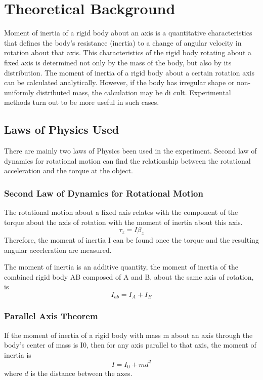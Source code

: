 \section{Theoretical Background}

Moment of inertia of a rigid body about an axis is a quantitative
characteristics that defines the body’s resistance (inertia) to a change of
angular velocity in rotation about that axis. 
This characteristics of the rigid body rotating about a fixed axis is determined
not only by the mass of the body, but also by its distribution. 
The moment of inertia of a rigid body about a certain rotation axis can be
calculated analytically. 
However, if the body has irregular shape or non-uniformly distributed mass, the
calculation may be di cult.
Experimental methods turn out to be more useful in such cases.

\subsection{Laws of Physics Used}

There are mainly two laws of Physics been used in the experiment. Second law of
dynamics for rotational motion can find the relationship between the rotational
acceleration and the torque at the object.

\subsubsection{Second Law of Dynamics for Rotational Motion}

The rotational motion about a fixed axis relates with the component of the
torque about the axis of rotation with the moment of inertia about this axis.
$$ \tau_z = I\beta_z$$
Therefore, the moment of inertia I can be found once the torque and the
resulting angular acceleration are measured.

The moment of inertia is an additive quantity, the moment of inertia of the
combined rigid body AB composed of A and B, about the same axis of rotation, is 
$$ I_{ab} = I_A + I_B $$


\subsubsection{Parallel Axis Theorem}
If the moment of inertia of a rigid body with mass m about an axis through the
body’s center of mass is I0, then for any axis parallel to that axis, the moment
of inertia is
$$ I = I_0 + md^2 $$
where $d$ is the distance between the axes.